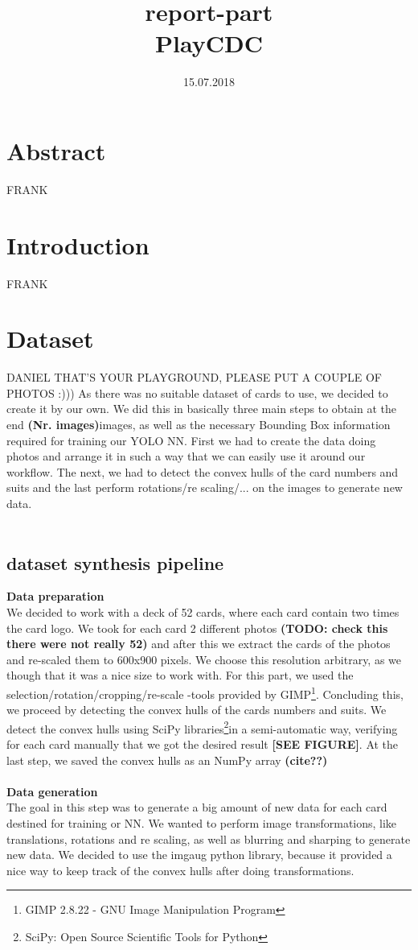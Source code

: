 \documentclass[a4paper]{article}
\title{\textbf{report-part}\\ PlayCDC}
\date{15.07.2018}
\begin{document}
\maketitle
\section{Abstract}
FRANK
\section{Introduction}
FRANK
\section{Dataset}
DANIEL THAT'S YOUR PLAYGROUND, PLEASE PUT A COUPLE OF PHOTOS :)))
As there was no suitable dataset of cards to use, we decided to create it by our own.  We did this in basically three main steps to obtain at the end \textbf{(Nr. images)}images,  as well as the necessary  Bounding Box information required for training our YOLO NN.   First we had to create the data doing photos and arrange it in such a way that  we can easily use it around our workflow.  The next, we had to detect the convex hulls of the card numbers and suits and the last perform rotations/re scaling/... on the images to generate new data.\\ \\
\subsection{dataset synthesis pipeline}


\large \textbf{Data preparation} \\
\normalsize
We decided to work with a deck of 52 cards, where each card contain two times the card logo.  We took for each card 2 different photos \textbf{(TODO: check this there were not really 52)} and after this we extract the cards of the photos and re-scaled them to 600x900 pixels.  We choose this resolution arbitrary, as we though that it was a nice size to work with.
For this part, we used the selection/rotation/cropping/re-scale -tools provided by GIMP\footnote{GIMP 2.8.22 - GNU Image Manipulation Program}.
Concluding this, we proceed by detecting the convex hulls of the cards numbers and suits.  We detect the convex hulls using SciPy libraries\footnote{SciPy: Open Source Scientific Tools for Python}in a semi-automatic way, verifying for each card manually that we got the desired result \textbf{[SEE FIGURE]}.
At the last step, we saved the convex hulls as an NumPy array \textbf{(cite??)} \\ \\
\large \textbf{Data generation} \\
\normalsize
The goal in this step was to generate a big amount of new data for each card destined for training or NN. We wanted to perform image transformations, like translations, rotations and re scaling, as well as blurring and sharping to generate new data.  We decided to use the imgaug python library, because it provided a nice way to keep track of the convex hulls after doing transformations. 
\end{document}
